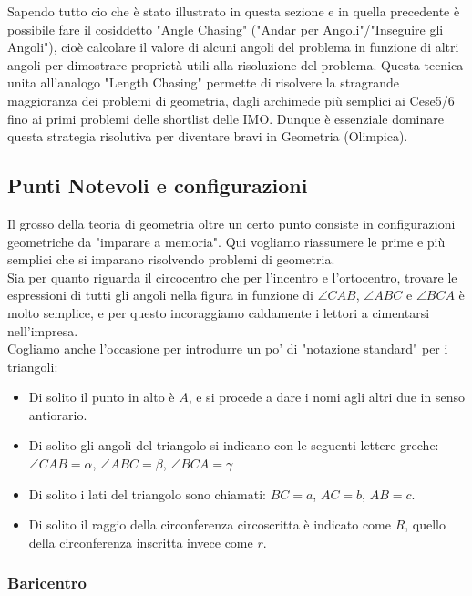 \documentclass[11pt]{scrartcl}
\begin{document}
	Sapendo tutto cio che è stato illustrato in questa sezione e in quella precedente è possibile fare il cosiddetto "Angle Chasing" ("Andar per Angoli"/"Inseguire gli Angoli"), cioè calcolare il valore di alcuni angoli del problema in funzione di altri angoli per dimostrare proprietà utili alla risoluzione del problema. Questa tecnica unita all'analogo "Length Chasing" permette di risolvere la stragrande maggioranza dei problemi di geometria, dagli archimede più semplici ai Cese5/6 fino ai primi problemi delle shortlist delle IMO. Dunque è essenziale dominare questa strategia risolutiva per diventare bravi in Geometria (Olimpica).
	
	\subsection{Punti Notevoli e configurazioni}
	Il grosso della teoria di geometria oltre un certo punto consiste in configurazioni geometriche da "imparare a memoria". Qui vogliamo riassumere le prime e più semplici che si imparano risolvendo problemi di geometria.\\
	Sia per quanto riguarda il circocentro che per l'incentro e l'ortocentro, trovare le espressioni di tutti gli angoli nella figura in funzione di $\angle CAB$, $\angle ABC$ e $\angle BCA$ è molto semplice, e per questo incoraggiamo caldamente i lettori a cimentarsi nell'impresa. \\
	Cogliamo anche l'occasione per introdurre un po' di "notazione standard" per i triangoli:
	\begin{itemize}
		\item Di solito il punto in alto è $A$, e si procede a dare i nomi agli altri due in senso antiorario.
		\item Di solito gli angoli del triangolo si indicano con le seguenti lettere greche: \\
		$\angle CAB=\alpha$, $\angle ABC = \beta$, $\angle BCA = \gamma$
		\item Di solito i lati del triangolo sono chiamati: $BC=a$, $AC=b$, $AB=c$.
		\item Di solito il raggio della circonferenza circoscritta è indicato come $R$, quello della circonferenza inscritta invece come $r$.
	\end{itemize}
	\subsubsection{Baricentro}
	
\end{document}
